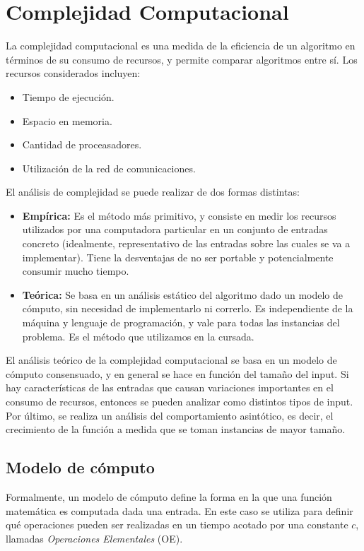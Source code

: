 \documentclass{article}
\begin{document}
\section{Complejidad Computacional}

La complejidad computacional es una medida de la eficiencia de un algoritmo en términos de su consumo de recursos, y permite comparar algoritmos entre sí. Los recursos considerados incluyen:
\begin{itemize}
    \item Tiempo de ejecución.
    \item Espacio en memoria.
    \item Cantidad de proceasadores.
    \item Utilización de la red de comunicaciones.
\end{itemize}

El análisis de complejidad se puede realizar de dos formas distintas:

\begin{itemize}
    \item \textbf{Empírica:} Es el método más primitivo, y consiste en medir los recursos utilizados por una computadora particular en un conjunto de entradas concreto (idealmente, representativo de las entradas sobre las cuales se va a implementar). Tiene la desventajas de no ser portable y potencialmente consumir mucho tiempo.
    \item \textbf{Teórica:} Se basa en un análisis estático del algoritmo dado un modelo de cómputo, sin necesidad de implementarlo ni correrlo. Es independiente de la máquina y lenguaje de programación, y vale para todas las instancias del problema. Es el método que utilizamos en la cursada.
\end{itemize}

El análisis teórico de la complejidad computacional se basa en un modelo de cómputo consensuado, y en general se hace en función del tamaño del input. Si hay características de las entradas que causan variaciones importantes en el consumo de recursos, entonces se pueden analizar como distintos tipos de input. Por último, se realiza un análisis del comportamiento asintótico, es decir, el crecimiento de la función a medida que se toman instancias de mayor tamaño.

\subsection{Modelo de cómputo}

Formalmente, un modelo de cómputo define la forma en la que una función matemática es computada dada una entrada. En este caso se utiliza para definir qué operaciones pueden ser realizadas en un tiempo acotado por una constante $c$, llamadas \textit{Operaciones Elementales} (OE).
\end{document}
